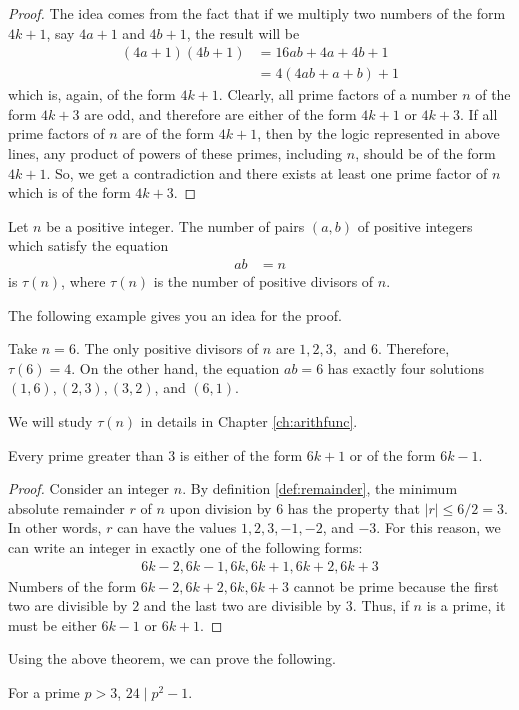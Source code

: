 \documentclass{subfile}
\begin{document}
	\begin{proof}
		The idea comes from the fact that if we multiply two numbers of the form $4k+1$, say $4a+1$ and $4b+1$, the result will be
		\begin{align*}
			(4a+1)(4b+1)
				& =16ab+4a+4b+1\\
				& =4(4ab+a+b)+1
		\end{align*}
		which is, again, of the form $4k+1$. Clearly, all prime factors of a number $n$ of the form $4k+3$ are odd, and therefore are either of the form $4k+1$ or $4k+3$. If all prime factors of $n$ are of the form $4k+1$, then by the logic represented in above lines, any product of powers of these primes, including $n$, should be of the form $4k+1$. So, we get a contradiction and there exists at least one prime factor of $n$ which is of the form $4k+3$.
	\end{proof}
	\begin{theorem}\label{thm:nos}
		Let $n$ be a positive integer. The number of pairs $(a,b)$ of positive integers which satisfy the equation
		\begin{align*}
			ab & = n
		\end{align*}
		is $\tau(n)$, where $\tau(n)$ is the number of positive divisors of $n$.
	\end{theorem}

	The following example gives you an idea for the proof.

	\begin{example}
		Take $n=6$. The only positive divisors of $n$ are $1,2,3,$ and $6$. Therefore, $\tau(6)=4$. On the other hand, the equation $ab=6$ has exactly four solutions $(1,6), (2,3),(3,2)$, and $(6,1)$.
	\end{example}

	We will study $\tau(n)$ in details in Chapter \autoref{ch:arithfunc}.

	\begin{theorem}
		Every prime greater than $3$ is either of the form $6k+1$ or of the form $6k-1$.
	\end{theorem}

	\begin{proof}
		Consider an integer $n$. By definition \eqref{def:remainder}, the minimum absolute remainder $r$ of $n$ upon division by $6$ has the property that $|r| \leq 6/2=3$. In other words, $r$ can have the values $1,2,3,-1,-2$, and $-3$. For this reason, we can write an integer in exactly one of the following forms:
		\begin{align*}
			6k-2,6k-1,6k,6k+1,6k+2,6k+3
		\end{align*}
		Numbers of the form $6k-2, 6k+2, 6k, 6k+3$ cannot be prime because the first two are divisible by $2$ and the last two are divisible by $3$. Thus, if $n$ is a prime, it must be either $6k-1$ or $6k+1$.
	\end{proof}
	Using the above theorem, we can prove the following.
	\begin{theorem}
		For a prime $p>3$, $24\mid p^2-1$.
	\end{theorem}
\end{document}
